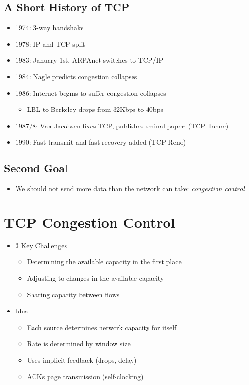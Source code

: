 \subsection{A Short History of TCP}
\begin{itemize}[nosep]
    \item 1974: 3-way handshake
    \item 1978: IP and TCP split
    \item 1983: January 1st, ARPAnet switches to TCP/IP
    \item 1984: Nagle predicts congestion collapses
    \item 1986: Internet begins to suffer congestion collapses
          \begin{itemize}[nosep]
              \item LBL to Berkeley drops from 32Kbps to 40bps
          \end{itemize}
    \item 1987/8: Van Jacobsen fixes TCP, publishes sminal paper: (TCP Tahoe)
    \item 1990: Fast transmit and fast recovery added (TCP Reno)
\end{itemize}

\subsection{Second Goal}
\begin{itemize}[nosep]
    \item We should not send more data than the network can take: \emph{congestion control}
\end{itemize}

\section{TCP Congestion Control}
\begin{itemize}[nosep]
    \item 3 Key Challenges
          \begin{itemize}[nosep]
              \item Determining the available capacity in the first place
              \item Adjusting to changes in the available capacity
              \item Sharing capacity between flows
          \end{itemize}
    \item Idea
          \begin{itemize}[nosep]
              \item Each source determines network capacity for itself
              \item Rate is determined by window size
              \item Uses implicit feedback (drops, delay)
              \item ACKs page transmission (self-clocking)
          \end{itemize}
\end{itemize}

